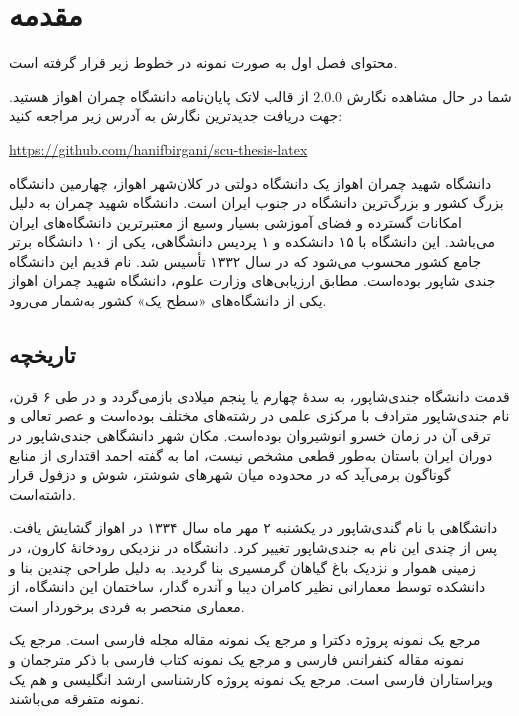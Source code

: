 
\chapter{مقدمه} \label{chapter:introduction}

محتوای فصل اول به صورت نمونه در خطوط زیر قرار گرفته است.

شما در حال مشاهده نگارش $2.0.0$ از قالب لاتک پایان‌نامه دانشگاه چمران اهواز هستید. جهت دریافت جدیدترین نگارش به آدرس زیر مراجعه کنید:

\begin{center}
	\href{https://github.com/hanifbirgani/scu-thesis-latex}{https://github.com/hanifbirgani/scu-thesis-latex}
\end{center}



دانشگاه شهید چمران اهواز یک دانشگاه دولتی در کلان‌شهر اهواز، چهارمین دانشگاه بزرگ کشور و بزرگ‌ترین دانشگاه در جنوب ایران است. دانشگاه شهید چمران به دلیل امکانات گسترده و فضای آموزشی بسیار وسیع از معتبرترین دانشگاه‌های ایران می‌باشد. این دانشگاه با ۱۵ دانشکده و ۱ پردیس دانشگاهی، یکی از ۱۰ دانشگاه برتر جامع کشور محسوب می‌شود که در سال ۱۳۳۲ تأسیس شد. نام قدیم این دانشگاه جندی شاپور بوده‌است. مطابق ارزیابی‌های وزارت علوم، دانشگاه شهید چمران اهواز یکی از دانشگاه‌های «سطح یک» کشور به‌شمار می‌رود.
\section{تاریخچه}\label{sec:history}

قدمت دانشگاه جندی‌شاپور، به سدهٔ چهارم یا پنجم میلادی بازمی‌گردد و در طی ۶ قرن، نام جندی‌شاپور مترادف با مرکزی علمی در رشته‌های مختلف بوده‌است و عصر تعالی و ترقی آن در زمان خسرو انوشیروان بوده‌است. مکان شهر دانشگاهی جندی‌شاپور در دوران ایران باستان به‌طور قطعی مشخص نیست، اما به گفته احمد اقتداری از منابع گوناگون برمی‌آید که در محدوده میان شهرهای شوشتر، شوش و دزفول قرار داشته‌است.\cite{eghtedari00diyar}

دانشگاهی با نام گندی‌شاپور در یکشنبه ۲ مهر ماه سال ۱۳۳۴ در اهواز گشایش یافت. پس از چندی این نام به جندی‌شاپور تغییر کرد. دانشگاه در نزدیکی رودخانهٔ کارون، در زمینی هموار و نزدیک باغ گیاهان گرمسیری بنا گردید. به دلیل طراحی چندین بنا و دانشکده توسط معمارانی نظیر کامران دیبا و آندره گدار، ساختمان این دانشگاه، از معماری منحصر به فردی برخوردار است.

مرجع \cite{Omidali82phdThesis} یک نمونه پروژه دکترا و مرجع \cite{Vahedi87} یک نمونه مقاله مجله فارسی است.
مرجع \cite{Amintoosi87afzayesh}  یک نمونه  مقاله کنفرانس فارسی و
مرجع \cite{Pedram80osool} یک نمونه کتاب فارسی با ذکر مترجمان و ویراستاران فارسی است. مرجع \cite{Khalighi07MscThesis} یک نمونه پروژه کارشناسی ارشد انگلیسی و
\cite{Khalighi87xepersian} هم یک نمونه متفرقه  می‌باشند.

